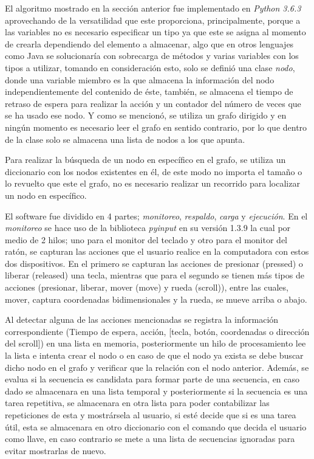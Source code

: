 
El algoritmo mostrado en la secci\'on anterior fue implementado en \emph{Python 3.6.3} aprovechando de la versatilidad que este proporciona, principalmente, porque a las variables no es necesario especificar un tipo ya que este se asigna al momento de crearla dependiendo del elemento a almacenar, algo que en otros lenguajes como Java se solucionar\'ia con sobrecarga de m\'etodos y varias variables con los tipos a utilizar, tomando en consideraci\'on esto, solo se defini\'o una clase \emph{nodo}, donde una variable miembro es la que almacena la informaci\'on del nodo independientemente del contenido de \'este, tambi\'en, se almacena el tiempo de retraso de espera para realizar la acci\'on y un contador del n\'umero de veces que se ha usado ese nodo. Y como se mencion\'o, se utiliza un grafo dirigido y en ning\'un momento es necesario leer el grafo en sentido contrario, por lo que dentro de la clase solo se almacena una lista de nodos a los que apunta. 


Para realizar la b\'usqueda de un nodo en espec\'ifico en el grafo, se utiliza un diccionario con los nodos existentes en \'el, de este modo no importa el tama\~no o lo revuelto que este el grafo, no es necesario realizar un recorrido para localizar un nodo en espec\'ifico.


El software fue dividido en 4 partes; \emph{monitoreo}, \emph{respaldo}, \emph{carga} y \emph{ejecuci\'on}. En el \emph{monitoreo} se hace uso de la biblioteca \emph{pyinput} en su versi\'on 1.3.9 la cual por medio de 2 hilos; uno para el monitor del teclado y otro para el monitor del rat\'on, se capturan las acciones que el usuario realice en la computadora con estos dos dispositivos. En el primero se capturan las acciones de presionar (pressed) o liberar (released) una tecla, mientras que para el segundo se tienen m\'as tipos de acciones (presionar, liberar, mover (move) y rueda (scroll)), entre las cuales, mover, captura coordenadas bidimensionales y la rueda, se mueve arriba o abajo. 


Al detectar alguna de las acciones mencionadas se registra la informaci\'on correspondiente (Tiempo de espera, acci\'on, [tecla, bot\'on, coordenadas o direcci\'on del scroll]) en una lista en memoria, posteriormente un hilo de procesamiento lee la lista e intenta crear el nodo o en caso de que el nodo ya exista se debe buscar dicho nodo en el grafo y verificar que la relaci\'on con el nodo anterior. Adem\'as, se evalua si la secuencia es candidata para formar parte de una secuencia, en caso dado se almacenara en una lista temporal y posteriormente si la secuencia es una tarea repetitiva, se almacenara en otra lista para poder contabilizar las repeticiones de esta y mostr\'arsela al usuario, si est\'e decide que si es una tarea \'util, esta se almacenara en otro diccionario con el comando que decida el usuario como llave, en caso contrario se mete a una lista de secuencias ignoradas para evitar mostrarlas de nuevo.


